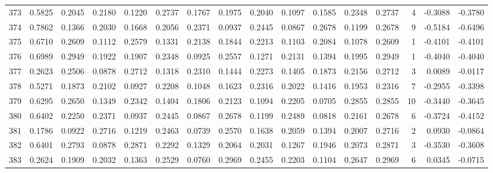 \begin{tabular}{lrrrrrrrrrrrrrrr}
373 &      0.5825 &  0.2045 &  0.2180 &  0.1220 &  0.2737 &  0.1767 &  0.1975 &  0.2040 &  0.1097 &  0.1585 &   0.2348 &     0.2737 &      4 &                   -0.3088 &                    -0.3780 \\
374 &      0.7862 &  0.1366 &  0.2030 &  0.1668 &  0.2056 &  0.2371 &  0.0937 &  0.2445 &  0.0867 &  0.2678 &   0.1199 &     0.2678 &      9 &                   -0.5184 &                    -0.6496 \\
375 &      0.6710 &  0.2609 &  0.1112 &  0.2579 &  0.1331 &  0.2138 &  0.1844 &  0.2213 &  0.1103 &  0.2084 &   0.1078 &     0.2609 &      1 &                   -0.4101 &                    -0.4101 \\
376 &      0.6989 &  0.2949 &  0.1922 &  0.1907 &  0.2348 &  0.0925 &  0.2557 &  0.1271 &  0.2131 &  0.1394 &   0.1995 &     0.2949 &      1 &                   -0.4040 &                    -0.4040 \\
377 &      0.2623 &  0.2506 &  0.0878 &  0.2712 &  0.1318 &  0.2310 &  0.1444 &  0.2273 &  0.1405 &  0.1873 &   0.2156 &     0.2712 &      3 &                    0.0089 &                    -0.0117 \\
378 &      0.5271 &  0.1873 &  0.2102 &  0.0927 &  0.2208 &  0.1048 &  0.1623 &  0.2316 &  0.2022 &  0.1416 &   0.1953 &     0.2316 &      7 &                   -0.2955 &                    -0.3398 \\
379 &      0.6295 &  0.2650 &  0.1349 &  0.2342 &  0.1404 &  0.1806 &  0.2123 &  0.1094 &  0.2205 &  0.0705 &   0.2855 &     0.2855 &     10 &                   -0.3440 &                    -0.3645 \\
380 &      0.6402 &  0.2250 &  0.2371 &  0.0937 &  0.2445 &  0.0867 &  0.2678 &  0.1199 &  0.2489 &  0.0818 &   0.2161 &     0.2678 &      6 &                   -0.3724 &                    -0.4152 \\
381 &      0.1786 &  0.0922 &  0.2716 &  0.1219 &  0.2463 &  0.0739 &  0.2570 &  0.1638 &  0.2059 &  0.1394 &   0.2007 &     0.2716 &      2 &                    0.0930 &                    -0.0864 \\
382 &      0.6401 &  0.2793 &  0.0878 &  0.2871 &  0.2292 &  0.1329 &  0.2064 &  0.2031 &  0.1267 &  0.1946 &   0.2073 &     0.2871 &      3 &                   -0.3530 &                    -0.3608 \\
383 &      0.2624 &  0.1909 &  0.2032 &  0.1363 &  0.2529 &  0.0760 &  0.2969 &  0.2455 &  0.2203 &  0.1104 &   0.2647 &     0.2969 &      6 &                    0.0345 &                    -0.0715 \\

\end{tabular}
